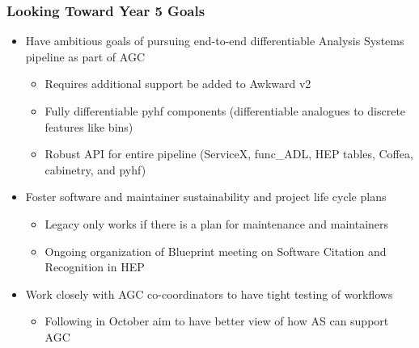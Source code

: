 \begin{frame}
  \frametitle{Looking Toward Year 5 Goals}

  \begin{itemize}
    \item Have ambitious goals of pursuing end-to-end differentiable Analysis Systems pipeline as part of AGC
    \begin{itemize}
      \item Requires additional support be added to Awkward v2
      \item Fully differentiable pyhf components (differentiable analogues to discrete features like bins)
      \item Robust API for entire pipeline (ServiceX, func\_ADL, HEP tables, Coffea, cabinetry, and pyhf)
    \end{itemize}
  \item Foster software and maintainer sustainability and project life cycle plans
  \begin{itemize}
    \item Legacy only works if there is a plan for maintenance and maintainers
    \item Ongoing organization of Blueprint meeting on Software Citation and Recognition in HEP
  \end{itemize}
  \item Work closely with AGC co-coordinators to have tight testing of workflows
    \begin{itemize}
      \item Following  in October aim to have better view of how AS can support AGC
    \end{itemize}
  \end{itemize}

\end{frame}

